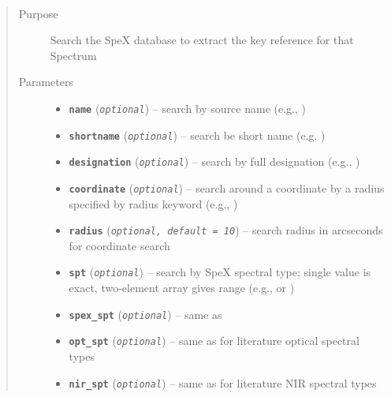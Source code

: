 \documentclass[letterpaper,10pt,english]{sphinxmanual}
\begin{document}
\begin{fulllineitems}
\label{api:splat_db.searchLibrary}~\begin{quote}\begin{description}
\item[{Purpose}] \leavevmode
Search the SpeX database to extract the key reference for that Spectrum

\item[{Parameters}] \leavevmode\begin{itemize}
\item {} 
\textbf{\texttt{name}} (\emph{\texttt{optional}}) -- search by source name (e.g., )

\item {} 
\textbf{\texttt{shortname}} (\emph{\texttt{optional}}) -- search be short name (e.g. )

\item {} 
\textbf{\texttt{designation}} (\emph{\texttt{optional}}) -- search by full designation (e.g., )

\item {} 
\textbf{\texttt{coordinate}} (\emph{\texttt{optional}}) -- search around a coordinate by a radius specified by radius keyword (e.g., )

\item {} 
\textbf{\texttt{radius}} (\emph{\texttt{optional, default = 10}}) -- search radius in arcseconds for coordinate search

\item {} 
\textbf{\texttt{spt}} (\emph{\texttt{optional}}) -- search by SpeX spectral type; single value is exact, two-element array gives range (e.g.,  or )

\item {} 
\textbf{\texttt{spex\_spt}} (\emph{\texttt{optional}}) -- same as 

\item {} 
\textbf{\texttt{opt\_spt}} (\emph{\texttt{optional}}) -- same as  for literature optical spectral types

\item {} 
\textbf{\texttt{nir\_spt}} (\emph{\texttt{optional}}) -- same as  for literature NIR spectral types


\end{itemize}
\end{description}
\end{quote}
\end{fulllineitems}
\end{document}
